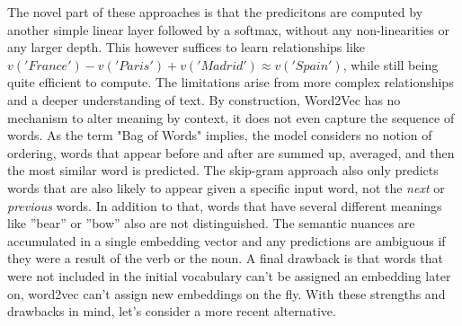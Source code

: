 \documentclass[draft,final]{vutinfth} %
\begin{document}
The novel part of these approaches is that the predicitons are computed by another simple linear layer followed by a softmax, without any non-linearities or any larger depth. \cite{word2vec_preprint} This however suffices to learn relationships like $v('France') - v('Paris') + v('Madrid') \approx v('Spain')$, while still being quite efficient to compute. \cite{word2vec_official} The limitations arise from more complex relationships and a deeper understanding of text. By construction, Word2Vec has no mechanism to alter meaning by context, it does not even capture the sequence of words. As the term "Bag of Words" implies, the model considers no notion of ordering, words that appear before and after are summed up, averaged, and then the most similar word is predicted. The skip-gram approach also only predicts words that are also likely to appear given a specific input word, not the \textit{next} or \textit{previous} words. In addition to that, words that have several different meanings like ''bear'' or ''bow'' also are not distinguished. The semantic nuances are accumulated in a single embedding vector and any predictions are ambiguous if they were a result of the verb or the noun. A final drawback is that words that were not included in the initial vocabulary can't be assigned an embedding later on, word2vec can't assign new embeddings on the fly. With these strengths and drawbacks in mind, let's consider a more recent alternative. 
\end{document}
